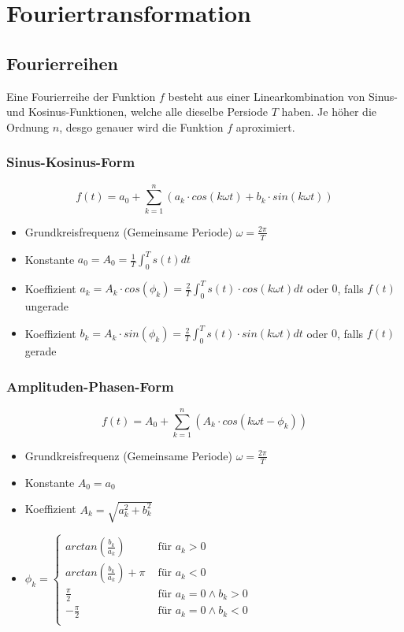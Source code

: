 \section{Fouriertransformation}
\subsection{Fourierreihen}
Eine Fourierreihe der Funktion $f$ besteht aus einer Linearkombination
von Sinus- und Kosinus-Funktionen, welche alle dieselbe Persiode $T$
haben. Je höher die Ordnung $n$, desgo genauer wird die Funktion $f$ aproximiert.

\subsubsection{Sinus-Kosinus-Form}
\[
  f(t) = a_0 + \sum_{k=1}^{n}
  (a_k \cdot cos(k \omega t) + b_k \cdot sin(k \omega t))
\]
\begin{itemize}
  \item Grundkreisfrequenz (Gemeinsame Periode) $\omega = \frac{2\pi}{T}$
  \item Konstante $a_0 = A_0 = \frac{1}{T}\int_0^T s(t) dt$
  \item Koeffizient $a_k = A_k \cdot cos(\phi_k) =
    \frac{2}{T} \int_0^T s(t) \cdot cos(k \omega t) dt$
    oder $0$, falls $f(t)$ ungerade
  \item Koeffizient $b_k = A_k \cdot sin(\phi_k) =
    \frac{2}{T} \int_0^T s(t) \cdot sin(k \omega t) dt$
    oder $0$, falls $f(t)$ gerade
\end{itemize}

\subsubsection{Amplituden-Phasen-Form}
\[
  f(t) = A_0 + \sum_{k=1}^{n}
  (A_k \cdot cos(k \omega t  - \phi_k))
\]
\begin{itemize}
  \item Grundkreisfrequenz (Gemeinsame Periode) $\omega = \frac{2\pi}{T}$
  \item Konstante $A_0 = a_0$
  \item Koeffizient $A_k = \sqrt{a_k^2 + b_k^2}$
  \item $\phi_k =  \begin{cases}
      arctan\left(\frac{b_k}{a_k}\right) & \text{ für } a_k > 0 \\
      arctan\left(\frac{b_k}{a_k}\right) + \pi & \text{ für } a_k < 0 \\
      \frac{\pi}{2} & \text{ für } a_k = 0 \wedge b_k > 0\\
      -\frac{\pi}{2} & \text{ für } a_k = 0 \wedge b_k < 0\\
    \end{cases}$
\end{itemize}


